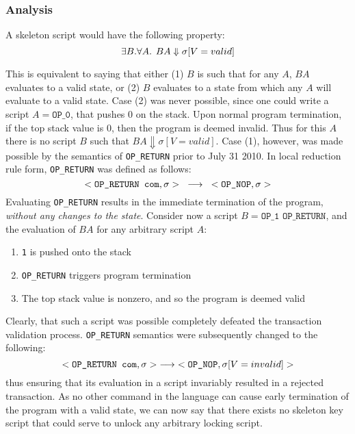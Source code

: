 \documentclass[letterpaper, 10 pt, conference]{ieeeconf}
\begin{document}
\subsubsection{Analysis}
A skeleton script would have the following property: 
$$\exists B. \forall A. \hspace{1.5mm} BA \Downarrow \sigma[V=valid]$$

This is equivalent to saying that either (1) $B$ is such that for any $A$, $BA$ evaluates to a valid state, or (2) $B$ evaluates to a state from which any $A$ will evaluate to a valid state. Case (2) was never possible, since one could write a script $A = \texttt{OP\_0}$, that pushes 0 on the stack. Upon normal program termination, if the top stack value is 0, then the program is deemed invalid. Thus for this $A$ there is no script $B$ such that $BA \Downarrow \sigma[V=valid]$. Case (1), however, was made possible by the semantics of \texttt{OP\_RETURN} prior to July 31 2010. In local reduction rule form, \texttt{OP\_RETURN} was defined as follows:
%
$$<\texttt{OP\_RETURN com}, \sigma> \hspace{3mm} \longrightarrow \hspace{3mm} <\texttt{OP\_NOP}, \sigma>$$
%
Evaluating \texttt{OP\_RETURN} results in the immediate termination of the program, \textit{without any changes to the state}. Consider now a script $B = \texttt{OP\_1 OP\_RETURN}$, and the evaluation of $BA$ for any arbitrary script $A$:

\begin{enumerate}
  \item \texttt{1} is pushed onto the stack
  \item \texttt{OP\_RETURN} triggers program termination
  \item The top stack value is nonzero, and so the program is deemed valid
\end{enumerate}

Clearly, that such a script was possible completely defeated the transaction validation process. \texttt{OP\_RETURN} semantics were subsequently changed to the following:
%
$$<\texttt{OP\_RETURN com}, \sigma> \hspace{1mm} \longrightarrow \hspace{1mm} <\texttt{OP\_NOP}, \sigma[V=invalid]>$$
%
thus ensuring that its evaluation in a script invariably resulted in a rejected transaction.
As no other command in the language can cause early termination of the program with a valid state, we can now say that there exists no skeleton key script that could serve to unlock any arbitrary locking script.
\end{document}
